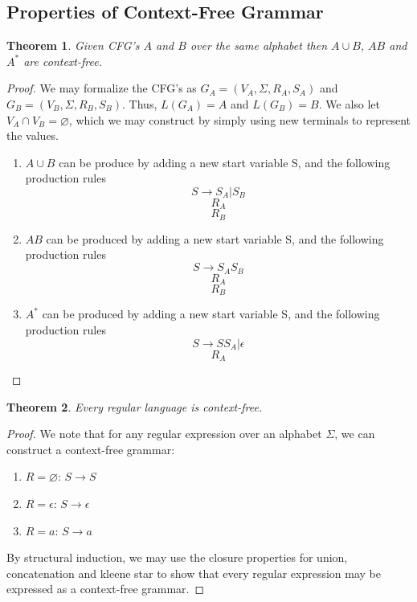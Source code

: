 \documentclass[11pt]{article}
\let\emptyset\varnothing
\theoremstyle{plain} %
\newtheorem*{theorem}{Theorem}
\theoremstyle{definition}
\theoremstyle{example}
\theoremstyle{remark}
\begin{document}
\subsection{Properties of Context-Free Grammar}

\begin{theorem}
Given CFG's $A$ and $B$ over the same alphabet then $A \cup B$, $AB$ and $A^*$ are context-free.
\end{theorem}

\begin{proof}
We may formalize the CFG's as $G_A = (V_A, \Sigma, R_A, S_A)$ and $G_B = (V_B, \Sigma, R_B, S_B)$. Thus, $L(G_A) = A$ and $L(G_B) = B$. We also let $V_A \cap V_B = \emptyset$, which we may construct by simply using new terminals to represent the values. 

\begin{enumerate}
	\item $A\cup B$ can be produce by adding a new start variable S, and the following production rules $$S \rightarrow S_A | S_B$$
	$$R_A$$
	$$R_B$$
	\item $AB$ can be produced by adding a new start variable S, and the following production rules $$S \rightarrow S_AS_B$$
	$$R_A$$
	$$R_B$$
	\item $A^*$ can be produced by adding a new start variable S, and the following production rules $$S \rightarrow SS_A|\epsilon$$
	$$R_A$$
\end{enumerate}
\end{proof}

\begin{theorem}
Every regular language is context-free.

\end{theorem}

\begin{proof}
We note that for any regular expression over an alphabet $\Sigma$, we can construct a context-free grammar: 
\begin{enumerate}
	\item $R = \emptyset$:	$S \rightarrow S$
	\item $R = \epsilon$: $S \rightarrow \epsilon$
	\item $R = a$:	$S \rightarrow a$
\end{enumerate}

By structural induction, we may use the closure properties for union, concatenation and kleene star to show that every regular expression may be expressed as a context-free grammar.
\end{proof}
\end{document}
